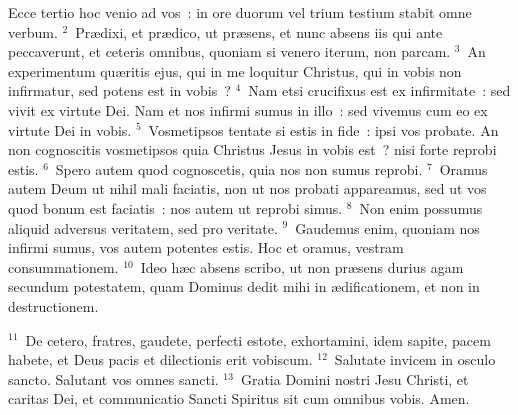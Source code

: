 \lettrine[lines=3,image=true,loversize=0.05,lraise=-0.03]{E}{}cce tertio hoc venio ad vos~: in ore duorum vel trium testium stabit omne verbum.
${}^{2}$~Pr\ae dixi, et pr\ae dico, ut pr\ae sens, et nunc absens iis qui ante peccaverunt, et ceteris omnibus, quoniam si venero iterum, non parcam.
${}^{3}$~An experimentum qu\ae ritis ejus, qui in me loquitur Christus, qui in vobis non infirmatur, sed potens est in vobis~?
${}^{4}$~Nam etsi crucifixus est ex infirmitate~: sed vivit ex virtute Dei. Nam et nos infirmi sumus in illo~: sed vivemus cum eo ex virtute Dei in vobis.
${}^{5}$~Vosmetipsos tentate si estis in fide~: ipsi vos probate. An non cognoscitis vosmetipsos quia Christus Jesus in vobis est~? nisi forte reprobi estis.
${}^{6}$~Spero autem quod cognoscetis, quia nos non sumus reprobi.
${}^{7}$~Oramus autem Deum ut nihil mali faciatis, non ut nos probati appareamus, sed ut vos quod bonum est faciatis~: nos autem ut reprobi simus.
${}^{8}$~Non enim possumus aliquid adversus veritatem, sed pro veritate.
${}^{9}$~Gaudemus enim, quoniam nos infirmi sumus, vos autem potentes estis. Hoc et oramus, vestram consummationem.
${}^{10}$~Ideo h\ae c absens scribo, ut non pr\ae sens durius agam secundum potestatem, quam Dominus dedit mihi in \ae dificationem, et non in destructionem.


${}^{11}$~De cetero, fratres, gaudete, perfecti estote, exhortamini, idem sapite, pacem habete, et Deus pacis et dilectionis erit vobiscum.
${}^{12}$~Salutate invicem in osculo sancto. Salutant vos omnes sancti.
${}^{13}$~Gratia Domini nostri Jesu Christi, et caritas Dei, et communicatio Sancti Spiritus sit cum omnibus vobis. Amen.
